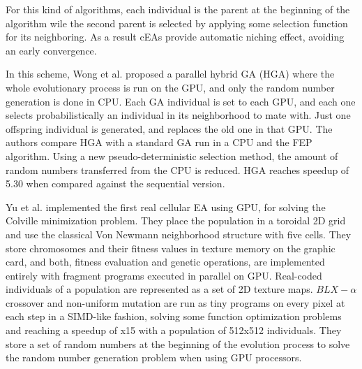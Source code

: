 \documentclass[prodmode,acmtecs]{acmsmall}
\begin{document}
For this kind of algorithms, each individual is the parent at the beginning of the algorithm wile the second parent is selected by applying some selection function for its neighboring. As a result cEAs provide automatic niching effect, avoiding an early convergence. 


In this scheme, Wong et al. \cite{man-leung-wong-parallel-2006,wong-implementation-2009} proposed a parallel hybrid GA (HGA) where the whole evolutionary process is run on the GPU, and only the random number generation is done in CPU. Each GA individual is set to each GPU, and each one selects probabilistically an individual in its neighborhood to mate with. Just one offspring individual is generated, and replaces the old one in that GPU. The authors compare HGA with a standard GA run in a CPU and the FEP \cite{man-leung-wong-parallel-2005} algorithm. Using a new pseudo-deterministic selection method, the amount of random numbers transferred from the CPU is reduced. HGA reaches speedup of 5.30 when compared against the sequential version.




Yu et al. \cite{yu-parallel-2005} implemented the first real cellular EA using GPU, for solving the Colville minimization problem. They place the population in a toroidal 2D grid and use the classical Von Newmann neighborhood structure with five cells. They store chromosomes and their fitness values in texture memory on the graphic card, and both, fitness evaluation and genetic operations, are implemented entirely with fragment programs executed in parallel on GPU. Real-coded individuals of a population are represented as a set of 2D texture maps. $BLX-\alpha$ crossover and non-uniform mutation are run as tiny programs on every pixel at each step in a SIMD-like fashion, solving some function optimization problems and reaching a speedup of x15 with a population of 512x512 individuals. They store a set of random numbers at the beginning of the evolution process to solve the random number generation problem when using GPU processors. 
\end{document}
